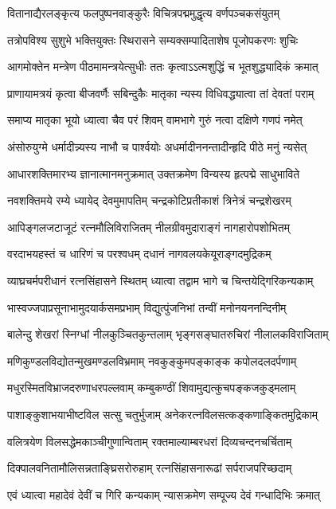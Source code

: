 \begin{center}
\twolineshloka
{वितानाद्यैरलङ्कृत्य फलपुष्पनवाङ्कुरैः}
{विचित्रपद्ममुद्धृत्य वर्णपञ्चकसंयुतम्} %

\twolineshloka
{तत्रोपविश्य सुशुभे भक्तियुक्तः स्थिरासने}
{सम्यक्सम्पादिताशेष पूजोपकरणः शुचिः} %

\twolineshloka
{आगमोक्तेन मन्त्रेण पीठमामन्त्रयेत्सुधीः}
{ततः कृत्वाऽऽत्मशुद्धिं च भूतशुद्ध्यादिकं क्रमात्} %

\twolineshloka
{प्राणायामत्रयं कृत्वा बीजवर्णैः सबिन्दुकैः}
{मातृका न्यस्य विधिवद्ध्यात्वा तां देवतां पराम्} %

\twolineshloka
{समाप्य मातृका भूयो ध्यात्वा चैव परं शिवम्}
{वामभागे गुरुं नत्वा दक्षिणे गणपं नमेत्} %

\twolineshloka
{अंसोरुयुग्मे धर्मादीन्न्यस्य नाभौ च पार्श्वयोः}
{अधर्मादीननन्तादीन्हृदि पीठे मनुं न्यसेत्} %

\twolineshloka
{आधारशक्तिमारभ्य ज्ञानात्मानमनुक्रमात्}
{उक्तक्रमेण विन्यस्य हृत्पद्मे साधुभाविते} %

\twolineshloka
{नवशक्तिमये रम्ये ध्यायेद् देवमुमापतिम्}
{चन्द्रकोटिप्रतीकाशं त्रिनेत्रं चन्द्रशेखरम्} %

\twolineshloka
{आपिङ्गलजटाजूटं रत्नमौलिविराजितम्}
{नीलग्रीवमुदाराङ्गं नागहारोपशोभितम्} %

\twolineshloka
{वरदाभयहस्तं च धारिणं च परश्वधम्}
{दधानं नागवलयकेयूराङ्गदमुद्रिकम्} %

\twolineshloka
{व्याघ्रचर्मपरीधानं रत्नसिंहासने स्थितम्}
{ध्यात्वा तद्वाम भागे च चिन्तयेद्गिरिकन्यकाम्} %

\twolineshloka
{भास्वज्जपाप्रसूनाभामुदयार्कसमप्रभाम्}
{विद्युत्पुंजनिभां तन्वीं मनोनयननन्दिनीम्} %

\twolineshloka
{बालेन्दु शेखरां स्निग्धां नीलकुञ्चितकुन्तलाम्}
{भृङ्गसङ्घातरुचिरां नीलालकविराजिताम्} %

\twolineshloka
{मणिकुण्डलविद्योतन्मुखमण्डलविभ्रमाम्}
{नवकुङ्कुमपङ्काङ्क कपोलदलदर्पणाम्} %

\twolineshloka
{मधुरस्मितविभ्राजदरुणाधरपल्लवाम्}
{कम्बुकण्ठीं शिवामुद्यत्कुचपङ्कजकुड्मलाम्} %

\twolineshloka
{पाशाङ्कुशाभयाभीष्टविल सत्सु चतुर्भुजाम्}
{अनेकरत्नविलसत्कङ्कणाङ्कितमुद्रिकाम्} %

\twolineshloka
{वलित्रयेण विलसद्धेमकाञ्चीगुणान्विताम्}
{रक्तमाल्याम्बरधरां दिव्यचन्दनचर्चिताम्} %

\twolineshloka
{दिक्पालवनितामौलिसन्नताङ्घ्रिसरोरुहाम्}
{रत्नसिंहासनारूढां सर्पराजपरिच्छदाम्} %

\twolineshloka
{एवं ध्यात्वा महादेवं देवीं च गिरि कन्यकाम्}
{न्यासक्रमेण सम्पूज्य देवं गन्धादिभिः क्रमात्} %


\end{center}
